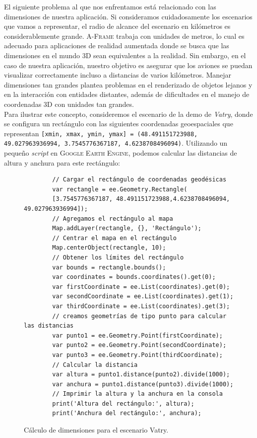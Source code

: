 \documentclass[a4paper, 11pt]{book}
\begin{document}
El siguiente problema al que nos enfrentamos está relacionado con las dimensiones de nuestra aplicación. Si consideramos cuidadosamente los escenarios que vamos a representar, el radio de alcance del escenario en kilómetros es considerablemente grande. \textsc{A-Frame} trabaja con unidades de metros, lo cual es adecuado para aplicaciones de realidad aumentada donde se busca que las dimensiones en el mundo 3D sean equivalentes a la realidad. Sin embargo, en el caso de nuestra aplicación, nuestro objetivo es asegurar que los aviones se puedan visualizar correctamente incluso a distancias de varios kilómetros. Manejar dimensiones tan grandes plantea problemas en el renderizado de objetos lejanos y en la interacción con entidades distantes, además de dificultades en el manejo de coordenadas 3D con unidades tan grandes.\\
Para ilustrar este concepto, consideremos el escenario de la demo de \emph{Vatry}, donde se configura un rectángulo con las siguientes coordenadas geoespaciales que representan \texttt{[xmin, xmax, ymin, ymax] = (48.491151723988, 49.027963936994, 3.7545776367187, 4.6238708496094)}. Utilizando un pequeño \emph{script} en \textsc{Google Earth Engine}, podemos calcular las distancias de altura y anchura para este rectángulo:
\begin{figure}[H]
	\centering
	\begin{verbatim}
		// Cargar el rectángulo de coordenadas geodésicas
		var rectangle = ee.Geometry.Rectangle(
		[3.7545776367187, 48.491151723988,4.6238708496094, 49.027963936994]);
		// Agregamos el rectángulo al mapa
		Map.addLayer(rectangle, {}, 'Rectángulo');
		// Centrar el mapa en el rectángulo
		Map.centerObject(rectangle, 10);
		// Obtener los límites del rectángulo
		var bounds = rectangle.bounds();
		var coordinates = bounds.coordinates().get(0);
		var firstCoordinate = ee.List(coordinates).get(0);
		var secondCoordinate = ee.List(coordinates).get(1);
		var thirdCoordinate = ee.List(coordinates).get(3);
		// creamos geometrías de tipo punto para calcular las distancias
		var punto1 = ee.Geometry.Point(firstCoordinate);
		var punto2 = ee.Geometry.Point(secondCoordinate);
		var punto3 = ee.Geometry.Point(thirdCoordinate);
		// Calcular la distancia
		var altura = punto1.distance(punto2).divide(1000);
		var anchura = punto1.distance(punto3).divide(1000);
		// Imprimir la altura y la anchura en la consola
		print('Altura del rectángulo:', altura);
		print('Anchura del rectángulo:', anchura);
	\end{verbatim}
	\caption{Cálculo de dimensiones para el escenario Vatry.
		\label{codigo:dimensionesVatry}
	}
\end{figure}
\end{document}
